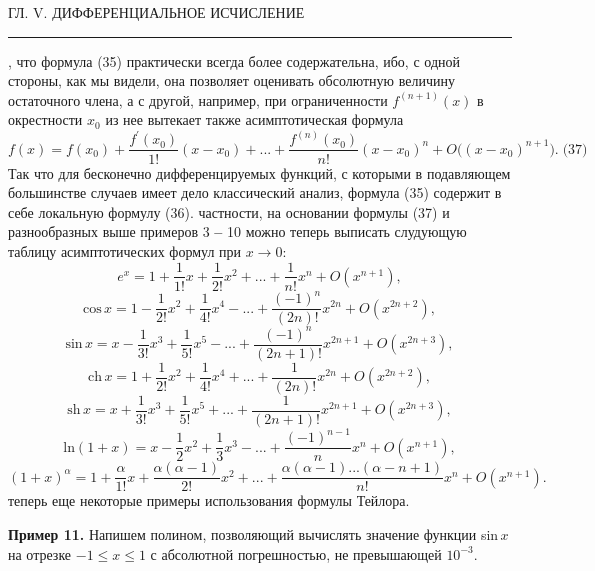 \documentclass[a5paper, 16pt]{book}
\begin{document}
    \begin{center}
        \begin{spacing}
            ГЛ. V. ДИФФЕРЕНЦИАЛЬНОЕ ИСЧИСЛЕНИЕ
            \noindent\rule{\textwidth}{1pt}
		\end{spacing}
    \end{center}
    , что формула (35) практически всегда более содержательна, ибо, с одной стороны, как мы видели, она позволяет оценивать обсолютную величину остаточного члена, а с другой, например, при ограниченности $f^{(n + 1)} (x)$ в окрестности $x_0$ из нее вытекает также асимптотическая формула
    $$f (x) = f (x_0) +  \frac{f^{'} (x_0)}{1!} (x - x_0) + . . . + \frac{f^{(n)} (x_0)}{n!} (x - x_0)^{n} + O \big((x - x_0)^{n + 1}\big). \; \textrm{(37)}$$
    Так что для бесконечно дифференцируемых функций, с которыми в подавляющем большинстве случаев имеет дело классический анализ, формула (35) содержит в себе локальную формулу (36).
     частности, на основании формулы (37) и разнообразных выше примеров 3 \textbf{--} 10 можно теперь выписать слудующую таблицу асимптотических формул при $x \to 0:$
    $$e^{x} = 1 + \frac{1}{1!} x + \frac{1}{2!} x^{2} + . . . + \frac{1}{n!} x^{n} + O(x^{n + 1}) ,$$
    $$\textrm{cos} \, x = 1 - \frac{1}{2!} x^{2} + \frac{1}{4!} x^{4} - . . . + \frac{(-1)^{n}}{(2n)!} x^{2n} + O(x^{2n + 2}),$$
    $$\textrm{sin} \, x = x - \frac{1}{3!} x^{3} + \frac{1}{5!} x^{5} - . . . + \frac{(-1)^{n}}{(2n + 1)!} x^{2n + 1} + O(x^{2n + 3}),$$
    $$\textrm{ch} \, x = 1 + \frac{1}{2!} x^{2} + \frac{1}{4!} x^{4} + . . . + \frac{1}{(2n)!} x^{2n} + O(x^{2n + 2}),$$
    $$\textrm{sh} \, x = x + \frac{1}{3!} x^{3} + \frac{1}{5!} x^{5} + . . . + \frac{1}{(2n + 1)!} x^{2n + 1} + O(x^{2n + 3}),$$
    $$\textrm{ln} (1 + x) = x - \frac{1}{2} x^{2} + \frac{1}{3} x^{3} - . . . + \frac{(-1)^{n - 1}}{n} x^{n} + O(x^{n + 1}),$$
    $$(1 + x)^{\alpha} = 1 + \frac{\alpha}{1!} x + \frac{\alpha (\alpha - 1)}{2!} x^{2} + . . . + \frac{\alpha (\alpha - 1) . . . (\alpha - n + 1)}{n!} x^{n} + O(x^{n + 1}).$$
     теперь еще некоторые примеры использования формулы Тейлора.
    \par\textbf{Пример 11.} Напишем полином, позволяющий вычислять значение функции sin\,$x$ на отрезке $-1 \leq x \leq 1$ с абсолютной погрешностью, не превышающей $10^{-3}$.

    \newpage
\end{document}
